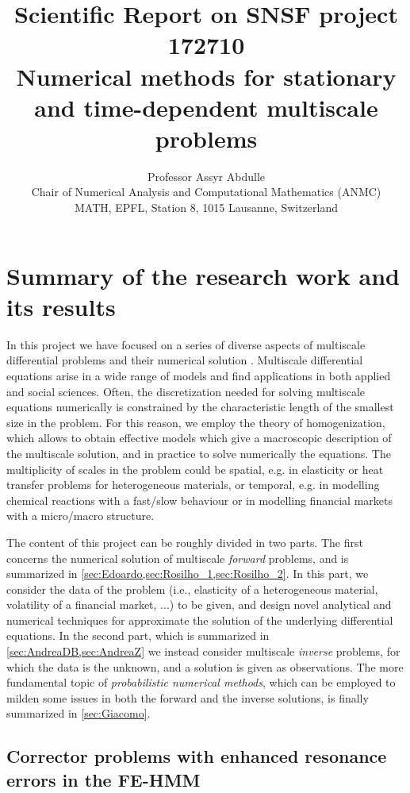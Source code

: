 \documentclass[10pt]{article}
\title{Scientific Report on SNSF project 172710 \\ Numerical methods for stationary and time-dependent multiscale problems}
\author{Professor Assyr Abdulle \\
	Chair of Numerical Analysis and Computational Mathematics (ANMC) \\
	MATH, EPFL, Station 8, 1015 Lausanne, Switzerland
}
\date{}
\begin{document}
	
\maketitle	

\section{Summary of the research work and its results}

In this project we have focused on a series of diverse aspects of multiscale differential problems \cite{BLP78,CiD99} and their numerical solution \cite{AEE12}. Multiscale differential equations arise in a wide range of models and find applications in both applied and social sciences. Often, the discretization needed for solving multiscale equations numerically is constrained by the characteristic length of the smallest size in the problem. For this reason, we employ the theory of homogenization, which allows to obtain effective models which give a macroscopic description of the multiscale solution, and in practice to solve numerically the equations. The multiplicity of scales in the problem could be spatial, e.g. in elasticity or heat transfer problems for heterogeneous materials, or temporal, e.g. in modelling chemical reactions with a fast/slow behaviour or in modelling financial markets with a micro/macro structure.

The content of this project can be roughly divided in two parts. The first concerns the numerical solution of multiscale \textit{forward} problems, and is summarized in \cref{sec:Edoardo,sec:Rosilho_1,sec:Rosilho_2}. In this part, we consider the data of the problem (i.e., elasticity of a heterogeneous material, volatility of a financial market, ...) to be given, and design novel analytical and numerical techniques for approximate the solution of the underlying differential equations. In the second part, which is summarized in \cref{sec:AndreaDB,sec:AndreaZ} we instead consider multiscale \textit{inverse} problems, for which the data is the unknown, and a solution is given as observations. The more fundamental topic of \textit{probabilistic numerical methods}, which can be employed to milden some issues in both the forward and the inverse solutions, is finally summarized in \cref{sec:Giacomo}.

\subsection{Corrector problems with enhanced resonance errors in the FE-HMM}\label{sec:Edoardo}
\end{document}
